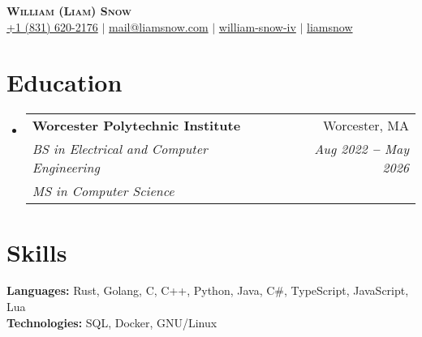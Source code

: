 \documentclass[12pt]{article}
\makeatletter
\newcommand{\entry}[1]{
  \item\small{
    {#1 \vspace{-2pt}}
  }
}
\newcommand{\educationheading}[6]{
  \vspace{-2pt}\item
    \begin{tabular*}{0.97\textwidth}[t]{l@{\extracolsep{\fill}}r}
      \textbf{#1} & #2 \\
      \textit{\small#3} & \textit{\small #4} \\
      \textit{\small#5} & \textit{\small #6} \\
    \end{tabular*}\vspace{-5pt}
}
\newcommand{\subheadingliststart}{\begin{itemize}[leftmargin=0.15in, label={}]}
\newcommand{\subheadinglistend}{\end{itemize}}
\makeatother
\begin{document}
\begin{center}
  \textbf{\Huge \scshape William (Liam) Snow} \\ \vspace{3pt}
    \small
    \faMobile \hspace{.5pt} \href{tel:8316202176}{+1 (831) 620-2176}
    $|$
    \faAt \hspace{.5pt} \href{mailto:mail@liamsnow.com}{mail@liamsnow.com}
    $|$
    \faLinkedinSquare \hspace{.5pt} \href{https://www.linkedin.com/in/william-snow-iv-140438169/}{william-snow-iv}
    $|$
    \faGithub \hspace{.5pt} \href{https://github.com/liamsnow}{liamsnow}
\end{center}

\section{Education}
  \vspace{3pt}
  \subheadingliststart
    \educationheading
      {Worcester Polytechnic Institute}{Worcester, MA}
      {BS in Electrical and Computer Engineering}{Aug 2022 \textbf{--} May 2026}
      {MS in Computer Science}{}
  \subheadinglistend

\section{Skills}
  \vspace{2pt}
  \subheadingliststart
    \small{\entry{
        \textbf{Languages:}{ Rust, Golang, C, C++, Python, Java, C\#, TypeScript, JavaScript, Lua } \\ \vspace{3pt}
        \textbf{Technologies:}{ SQL, Docker, GNU/Linux } \\ \vspace{3pt}
    }}
  \subheadinglistend
\end{document}

